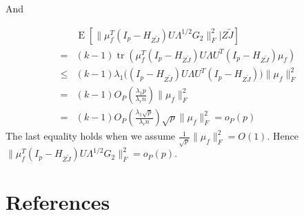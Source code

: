 \documentclass[review]{elsarticle}
\DeclareMathOperator{\mytr}{tr}
\DeclareMathOperator{\myE}{E}
\theoremstyle{plain}
\theoremstyle{definition}
\theoremstyle{remark}
\begin{document}
And

$$
    \begin{aligned}
        &\myE [\|\mu_f^T (I_p -H_{Z\tilde{J}})U\Lambda^{1/2}G_2\|_F^2|Z\tilde{J}]\\
        = &
        (k-1)\mytr(\mu_f^T (I_p -H_{Z\tilde{J}})U\Lambda U^T (I_p -H_{Z\tilde{J}})\mu_f)\\
        \leq &
        (k-1)\lambda_1\big((I_p -H_{Z\tilde{J}})U\Lambda U^T (I_p -H_{Z\tilde{J}})\big)\|\mu_f\|^2_F\\
        = &
        (k-1) O_P(\frac{\lambda_1 p}{\lambda_r n})  \|\mu_f\|^2_F\\
        = &
        (k-1) O_P(\frac{\lambda_1 \sqrt{p}}{\lambda_r n}) \sqrt{p}  \|\mu_f\|^2_F=o_P(p)
    \end{aligned}
$$
The last equality holds when we assume $\frac{1}{\sqrt{p}}\|\mu_f\|_F^2=O(1)$. Hence $\|\mu_f^T (I_p -H_{Z\tilde{J}})U\Lambda^{1/2}G_2\|_F^2=o_P(p)$.

\section*{References}


\end{document}
